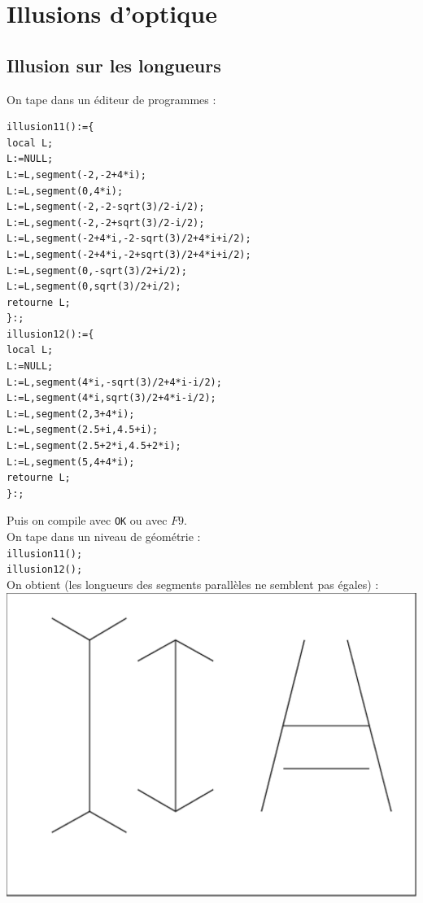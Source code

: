 \documentclass[a4paper,11pt]{book}
\begin{document}
\chapter{Illusions d'optique}
\section{Illusion sur les longueurs}
On tape dans un \'editeur de programmes :
\begin{verbatim}
illusion11():={
local L;
L:=NULL;
L:=L,segment(-2,-2+4*i);
L:=L,segment(0,4*i);
L:=L,segment(-2,-2-sqrt(3)/2-i/2);
L:=L,segment(-2,-2+sqrt(3)/2-i/2);
L:=L,segment(-2+4*i,-2-sqrt(3)/2+4*i+i/2);
L:=L,segment(-2+4*i,-2+sqrt(3)/2+4*i+i/2);
L:=L,segment(0,-sqrt(3)/2+i/2);
L:=L,segment(0,sqrt(3)/2+i/2);
retourne L;
}:;
illusion12():={
local L;
L:=NULL;
L:=L,segment(4*i,-sqrt(3)/2+4*i-i/2);
L:=L,segment(4*i,sqrt(3)/2+4*i-i/2);
L:=L,segment(2,3+4*i);
L:=L,segment(2.5+i,4.5+i);
L:=L,segment(2.5+2*i,4.5+2*i);
L:=L,segment(5,4+4*i);
retourne L;
}:;
\end{verbatim}
Puis on compile avec {\tt OK} ou avec $F9$.\\
On tape dans un niveau de g\'eom\'etrie :\\
{\tt illusion11();}\\
{\tt illusion12();}\\
On obtient (les longueurs des segments parall\`eles ne semblent pas \'egales) :\\
\includegraphics[width=\textwidth]{illusion1}
\end{document}
